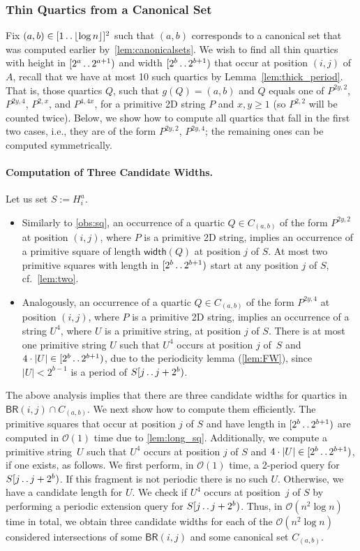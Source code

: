 \documentclass[11pt,letterpaper]{article}
\newcommand{\cO}{\mathcal{O}}
\newcommand{\floor}[1]{\left\lfloor #1 \right\rfloor}
\newcommand{\can}[2]{C_{(#1,#2)}}
\newcommand{\width}{\textsf{width}}
\newcommand{\BR}{\textsf{BR}}
\def\dd{\mathinner{.\,.}}
\newcommand{\hmeta}[2]{H_{#1}^{#2}}
\begin{document}
\subsubsection{Thin Quartics from a Canonical Set}
Fix $(a,b) \in [1 \dd \floor{\log n}]^2$ such that $(a,b)$ corresponds to a canonical set that was computed earlier by~\cref{lem:canonicalsets}.
We wish to find all thin quartics with height in $[2^a \dd 2^{a+1})$ and width $[2^b \dd 2^{b+1})$ that occur at position $(i,j)$ of $A$, recall that we have at most 10 such quartics by Lemma~\ref{lem:thick_period}.
That is, those quartics $Q$, such that $g(Q)=(a,b)$ and $Q$ equals one of $P^{2y,2}$, $P^{2y,4}$, $P^{2,x}$, and $P^{4,4x}$, for a primitive 2D string $P$ and $x,y\geq 1$ (so $P^{2,2}$ will be counted twice).
Below, we show how to compute all quartics that fall in the first two cases, i.e., they are of the form $P^{2y,2}$, $P^{2y,4}$; the remaining ones can be computed symmetrically.

\paragraph{Computation of Three Candidate Widths.}

Let us set $S:=\hmeta{i}{a}$.
\begin{itemize}
\item Similarly to \cref{obs:sq}, an occurrence of a quartic $Q\in \can{a}{b}$ of the form $P^{2y,2}$ at position $(i,j)$, where $P$ is a primitive 2D string, implies an occurrence of a primitive square of length $\width(Q)$ at position $j$ of $S$. At most two primitive squares with length in $[2^b \dd 2^{b+1})$ start at any position $j$ of $S$, cf.~\cref{lem:two}.
\item Analogously, an occurrence of a quartic $Q\in \can{a}{b}$ of the form $P^{2y,4}$ at position $(i,j)$, where $P$ is a primitive 2D string, implies an occurrence of a string $U^4$, where $U$ is a primitive string, at position $j$ of $S$.
There is at most one primitive string $U$ such that $U^4$ occurs at position $j$ of~$S$ and $4\cdot |U| \in [2^b \dd 2^{b+1})$, due to the periodicity lemma (\cref{lem:FW}), since $|U|<2^{b-1}$ is a period of $S[j \dd j+2^b)$.
\end{itemize}

The above analysis implies that there are three candidate widths for quartics in $\BR(i,j) \cap \can{a}{b}$. We next show how to compute them efficiently.
The primitive squares that occur at position $j$ of $S$ and have length in $[2^b \dd 2^{b+1})$ are computed in $\cO(1)$ time due to  \cref{lem:long_sq}.
Additionally, we compute a primitive string~$U$ such that $U^4$ occurs at position $j$ of $S$ and $4\cdot |U| \in [2^b \dd 2^{b+1})$, if one exists, as follows.
We first perform, in $\cO(1)$ time, a 2-period query for $S[j \dd j+2^b)$. If this fragment is not periodic there is no such $U$. Otherwise, we have a candidate length for $U$. We check if $U^4$ occurs at position~$j$ of $S$ by performing a periodic extension query for $S[j \dd j+2^b)$.
Thus, in $\cO(n^2 \log n)$ time in total, we obtain three candidate widths for each of the $\cO(n^2 \log n)$ considered intersections of some $\BR(i,j)$ and some canonical set $\can{a}{b}$.
\end{document}

